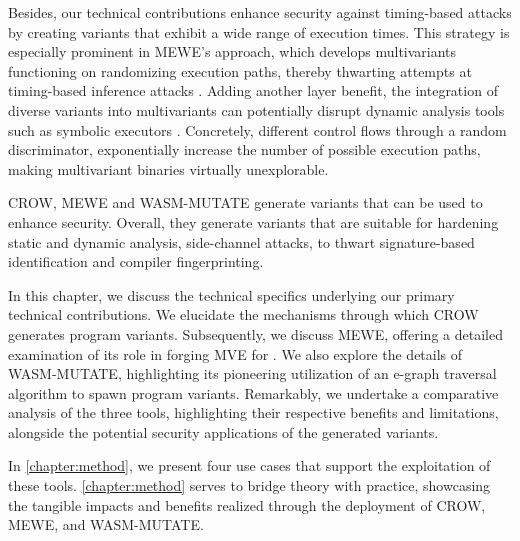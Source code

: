 Besides, our technical contributions enhance security against timing-based attacks by creating variants that exhibit a wide range of execution times. 
This strategy is especially prominent in MEWE’s approach, which develops multivariants functioning on randomizing execution paths, thereby thwarting attempts at timing-based inference attacks \cite{DBLP:conf/ndss/SchnitzlerKBP23}. 
Adding another layer benefit, the integration of diverse variants into multivariants can potentially disrupt dynamic analysis tools such as symbolic executors \cite{wasmixer}. 
Concretely, different control flows through a random discriminator, exponentially increase the number of possible execution paths, making multivariant binaries virtually unexplorable.


\begin{tcolorbox}[title=Takeaway,boxrule=1pt,arc=.2em,boxsep=1.0mm]
    CROW, MEWE and WASM-MUTATE generate \Wasm variants that can be used to enhance security. 
    Overall, they generate variants that are suitable for hardening static and dynamic analysis, side-channel attacks, to thwart signature-based identification and compiler fingerprinting. 
\end{tcolorbox}



In this chapter, we discuss the technical specifics underlying our primary technical contributions.
We elucidate the mechanisms through which CROW generates program variants.
Subsequently, we discuss MEWE, offering a detailed examination of its role in forging MVE for \Wasm. 
We also explore the details of WASM-MUTATE, highlighting its pioneering utilization of an e-graph traversal algorithm to spawn \wasm program variants. 
Remarkably, we undertake a comparative analysis of the three tools, highlighting their respective benefits and limitations, alongside the potential security applications of the generated \wasm variants. 

In \autoref{chapter:method}, we present four use cases that support the exploitation of these tools.
\autoref{chapter:method} serves to bridge theory with practice, showcasing the tangible impacts and benefits realized through the deployment of CROW, MEWE, and WASM-MUTATE.
